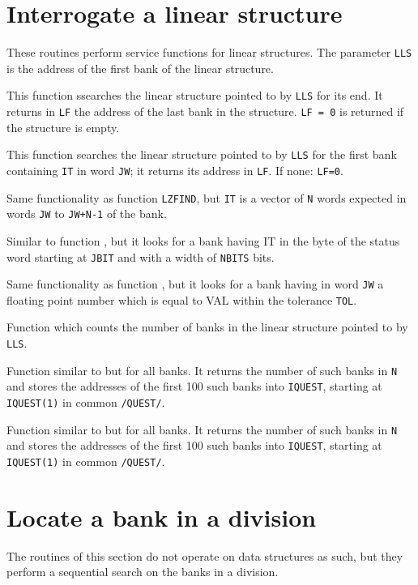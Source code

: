 \section{Interrogate a linear structure}
\par These routines perform service functions for linear structures.
The parameter {\tt LLS} is the address of the first bank
of the linear structure.
\par This function ssearches the linear structure pointed to by {\tt LLS}
for its end.
It returns in {\tt LF} the address of the last bank in the structure.
{\tt LF = 0} is returned if the structure is empty.
\par This function searches the linear structure pointed to by {\tt LLS}
for the first bank containing {\tt IT} in word {\tt JW};
it returns its address in {\tt LF}. If none: {\tt LF=0}.
\par Same functionality as function {\tt LZFIND},
but {\tt IT} is a vector of {\tt N} words expected
in words {\tt JW} to {\tt JW+N-1} of the bank.
\par Similar to function ,
but it looks for a bank having IT in the byte of the status word
starting at {\tt JBIT} and with a width of {\tt NBITS} bits.
\par Same functionality as function ,
but it looks for a bank having in word {\tt JW} a floating point number
which is equal to VAL within the tolerance {\tt TOL}.
\par Function which counts the number of banks in the linear
structure pointed to by {\tt LLS}.
\par Function similar to  but for all banks.
It returns the number of such banks in {\tt N}
and stores the addresses of the first 100 such banks into {\tt IQUEST},
starting at {\tt IQUEST(1)} in common {\tt /QUEST/}.
\par Function similar to  but for all banks.
It returns the number of such banks in {\tt N}
and stores the addresses of the first 100 such banks into {\tt IQUEST},
starting at {\tt IQUEST(1)} in common {\tt /QUEST/}.
\section{Locate a bank in a division}
\par
The routines of this section do not operate on data structures as such,
but they perform a sequential search on the banks in a division.
